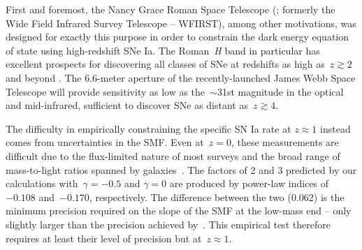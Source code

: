 \documentclass[ms.tex]{subfiles}
\begin{document}
First and foremost, the Nancy Grace Roman Space Telescope (\citealp{Spergel2013,
Spergel2015}; formerly the Wide Field Infrared Survey Telescope -- WFIRST),
among other motivations, was designed for exactly this purpose in order to
constrain the dark energy equation of state using high-redshift SNe Ia.
The Roman~\textit{H} band in particular has excellent prospects for discovering
all classes of SNe at redshifts as high as~$z \gtrsim 2$ and beyond
\citep{Petrushevska2016}.
The 6.6-meter aperture of the recently-launched James Webb Space Telescope
\citep[JWST;][]{Gardner2006} will provide sensitivity as low as the~$\sim$31st
magnitude in the optical and mid-infrared, sufficient to discover SNe as
distant as~$z \gtrsim 4$.
\par
The difficulty in empirically constraining the specific SN Ia rate at
$z \approx 1$ instead comes from uncertainties in the SMF.
Even at~$z = 0$, these measurements are difficult due to the flux-limited
nature of most surveys and the broad range of mass-to-light ratios spanned by
galaxies~\citep[see discussion in][]{Weigel2016}.
The factors of 2 and 3 predicted by our calculations with~$\gamma = -0.5$ and
$\gamma = 0$ are produced by power-law indices of~$-0.108$ and~$-0.170$,
respectively.
The difference between the two (0.062) is the minimum precision required on the
slope of the SMF at the low-mass end -- only slightly larger than the precision
achieved by~\citet[][$\pm 0.05$, see their Fig. 13]{Baldry2012}.
This empirical test therefore requires at least their level of precision but
at~$z \approx 1$.

\end{document}
